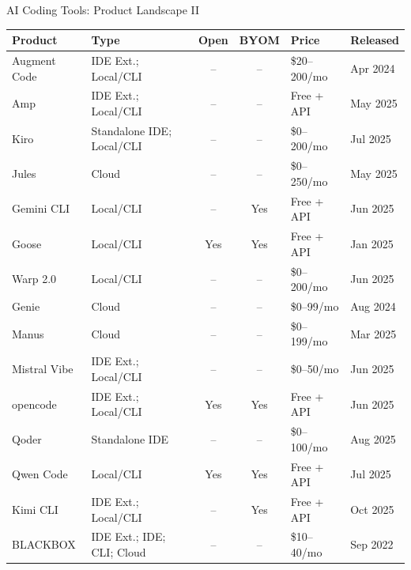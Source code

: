 \begin{frame}{AI Coding Tools: Product Landscape II}
\centering
\scriptsize
\begin{tabular}{p{2.6cm} p{2.7cm} c c p{1.7cm} p{1.4cm}}
\toprule
\textbf{Product} & \textbf{Type} & \textbf{Open} & \textbf{BYOM} & \textbf{Price} & \textbf{Released} \\
\midrule
Augment Code & IDE Ext.; Local/CLI & -- & -- & \$20--200/mo & Apr 2024 \\
Amp & IDE Ext.; Local/CLI & -- & -- & Free + API & May 2025 \\
Kiro & Standalone IDE; Local/CLI & -- & -- & \$0--200/mo & Jul 2025 \\
Jules & Cloud & -- & -- & \$0--250/mo & May 2025 \\
Gemini CLI & Local/CLI & -- & Yes & Free + API & Jun 2025 \\
Goose & Local/CLI & Yes & Yes & Free + API & Jan 2025 \\
Warp 2.0 & Local/CLI & -- & -- & \$0--200/mo & Jun 2025 \\
Genie & Cloud & -- & -- & \$0--99/mo & Aug 2024 \\
Manus & Cloud & -- & -- & \$0--199/mo & Mar 2025 \\
Mistral Vibe & IDE Ext.; Local/CLI & -- & -- & \$0--50/mo & Jun 2025 \\
opencode & IDE Ext.; Local/CLI & Yes & Yes & Free + API & Jun 2025 \\
Qoder & Standalone IDE & -- & -- & \$0--100/mo & Aug 2025 \\
Qwen Code & Local/CLI & Yes & Yes & Free + API & Jul 2025 \\
Kimi CLI & IDE Ext.; Local/CLI & -- & Yes & Free + API & Oct 2025 \\
BLACKBOX & IDE Ext.; IDE; CLI; Cloud & -- & -- & \$10--40/mo & Sep 2022 \\
\bottomrule
\end{tabular}
\end{frame}

